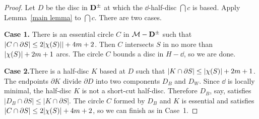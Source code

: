 \begin{proof}
Let $D$ be the disc in $\mathbf{D}^\pm$ at which the $\dd$-half-disc $\dint{c}$ is based.  Apply Lemma~\ref{main lemma} to $\dint{c}$.  There are two cases.

\textbf{Case 1.}  There is an essential circle $C$ in $\mathcal{M}-\mathbf{D}^\pm$ such 
that $|C\cap\partial S|\leq2| \chi (S) ||+4m+2$.  Then $C$ intersects
$S$ in no more than $| \chi (S) |+2m+1$ arcs.  The circle $C$ bounds
a disc in $H-\dd$, so we are done.

\textbf{Case 2.}There is a half-disc $K$ based at $D$ such that $|K\cap\partial S|\leq| \chi (S) |+2m+1$.  The endpoints $\partial K$ divide $\partial D$ into two components $D_B$ and $D_W$.  Since $\dd$ is locally minimal, the half-disc $K$ is not a short-cut
half-disc.  Therefore $D_B$, say, satisfies $|D_B\cap\partial S|\leq |K\cap\partial S|$.  The circle $C$ formed by $D_B$ and $K$ is essential and satisfies $|C\cap\partial S|\leq 2| \chi (S) |+4m+2$, so we can finish as in Case~1.
\end{proof}

